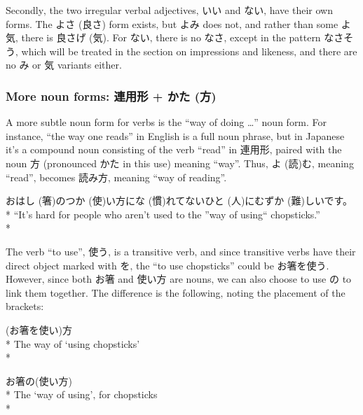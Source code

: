 \documentclass[11pt, b5paper, twoside, openright, onecolumn]{book}
\makeatletter
\newcommand*{\rubystack}[2]{{\relscale{0.5}%
  \begin{tabular}[b]{@{}c@{}}%
    {#1}\\%
   {\textscale{2}{#2}}%
  \end{tabular}}%
}
\DeclareRobustCommand*{\ruby}[2]{%
  \mbox{%
    \setlength{\parskip}{0ex}%
    \BeginAccSupp{method=pdfstringdef,ActualText={#1}}%
      \rubystack{\phantom{#2}}{#1}%
      \llap{%
        \rubystack{#2}{\phantom{#1}}%
      }%
    \EndAccSupp{}%
  }%
}
\renewcommand*{\ruby}[2]{#2 (#1)}%
\newenvironment{exampleblock}{
\setlength{\parindent}{0.6in}
\begin{minipage}[t]{\dimexpr\textwidth-\parindent}}
{\end{minipage}}
\makeatother
\begin{document}
Secondly‚ the two irregular verbal adjectives‚ いい and ない‚ have their own forms. The よさ (良さ) form exists‚ but よみ does not‚ and rather than some よ気‚ there is 良さ\ruby{気}{げ}. For ない‚ there is no なさ‚ except in the pattern なさそう‚ which will be treated in the section on impressions and likeness‚ and there are no み or 気 variants either.

\subsubsection{More noun forms: 連用形 + \ruby{方}{かた}}

A more subtle noun form for verbs is the “way of doing …” noun form. For instance‚ “the way one reads” in English is a full noun phrase‚ but in Japanese it’s a compound noun consisting of the verb “read” in 連用形‚ paired with the noun 方 (pronounced かた in this use) meaning “way”. Thus‚ \ruby{読}{よ}む‚ meaning “read”‚ becomes 読み方‚ meaning “way of reading”.

\vspace{0.4cm}
\begin{exampleblock}
お\ruby{箸}{はし}の\ruby{使}{つか}い方に\ruby{慣}{な}れてない\ruby{人}{ひと}に\ruby{難}{むずか}しいです。 \\* 
“It’s hard for people who aren’t used to the ”way of using“ chopsticks.” \\* 
\end{exampleblock}
\vspace{0.2cm}

The verb “to use”‚ 使う‚ is a transitive verb‚ and since transitive verbs have their direct object marked with を‚ the  “to use chopsticks” could be お箸を使う. However‚ since both お箸 and 使い方 are nouns‚ we can also choose to use の to link them together. The difference is the following‚ noting the placement of the brackets:

\vspace{0.4cm}
\begin{exampleblock}
(お箸を使い)方 \\* 
The way of ‘using chopsticks’ \\* 
\end{exampleblock}
\vspace{0.2cm}

\begin{exampleblock}
お箸の(使い方) \\* 
The ‘way of using’‚ for chopsticks \\* 
\end{exampleblock}
\vspace{0.2cm}
\end{document}
